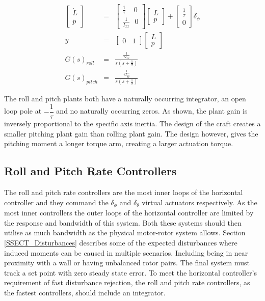 	\begin{eqnarray}
	\begin{bmatrix} \dot{L} \\ \dot{p}	\end{bmatrix}&=&\begin{bmatrix}\frac{1}{\tau}\ \ \ \ \ 0\\\frac{1}{I_{xx}} \ \ \ 0 \end{bmatrix} \begin{bmatrix} L \\ p \end{bmatrix} + \begin{bmatrix}\frac{1}{\tau}\\ 0 \end{bmatrix} \delta_\phi\label{EQ_RollStateSpace1}\\\label{EQ_RollStateSpace11} 
	y &=& \begin{bmatrix} 0 \ \ \ \ 1 \end{bmatrix} \begin{bmatrix} L \\ p \end{bmatrix} \label{EQ_RollStateSpace2}\\
	G(s)_{roll} &=& \frac{\frac{1}{\tau I_{xx}}}{s (s + \frac{1}{\tau})}\label{EQ_RollTF}\\
	G(s)_{pitch} &=& \frac{\frac{1}{\tau I_{yy}}}{s (s + \frac{1}{\tau})}\label{EQ_PitchTF}
	\end{eqnarray}
	
	The roll and pitch plants both have a naturally occurring integrator, an open loop pole at $-\dfrac{1}{\tau}$ and no naturally occurring zeros. As shown, the plant gain is inversely proportional to the specific axis inertia. The design of the craft creates a smaller pitching plant gain than rolling plant gain. The design however, gives the pitching moment a longer torque arm, creating a larger actuation torque.
	
	\subsection{Roll and Pitch Rate Controllers}
	The roll and pitch rate controllers are the most inner loops of the horizontal controller and they command the $\delta_\phi$ and $\delta_\theta$ virtual actuators respectively. As the most inner controllers the outer loops of the horizontal controller are limited by the response and bandwidth of this system. Both these systems should then utilise as much bandwidth as the physical motor-rotor system allows. Section \ref{SSECT_Disturbances} describes some of the expected disturbances where induced moments can be caused in multiple scenarios. Including being in near proximity with a wall or having unbalanced rotor pairs. The final system must track a set point with zero steady state error. To meet the horizontal controller's requirement of fast disturbance rejection, the roll and pitch rate controllers, as the fastest controllers, should include an integrator. 
	
